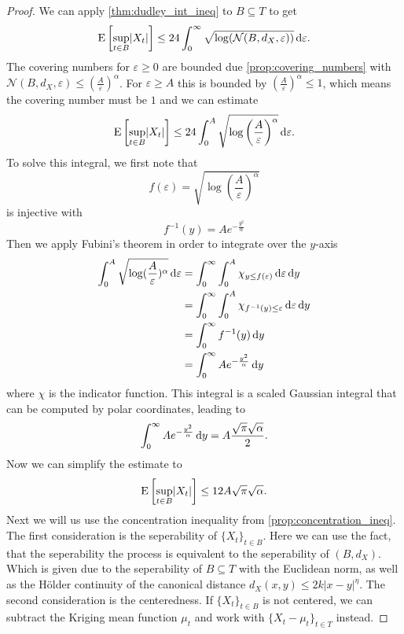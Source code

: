 \begin{proof}
We can apply \cref{thm:dudley_int_ineq} to $B \subseteq T$ to get
\[
    \E \left[ \sup_{t \in B} \lvert X_{t} \rvert \right]
    \leq
    24\int_{0}^{\infty} \sqrt{\log (\mathcal{N}(B,d_{X},\varepsilon) )}\dx[\varepsilon].
\]
The covering numbers for \( \varepsilon \geq 0 \) are bounded due \cref{prop:covering_numbers} with $\mathcal{N}(B,d_{X},\varepsilon) \leq \left( \frac{A}{\varepsilon}  \right)^{\alpha} $.
For \( \varepsilon \geq A \) this is bounded by $ \left( \frac{A}{\varepsilon}  \right)^{\alpha} \leq 1$, which means the covering number must be $1$ and we can estimate
\[
    \E \left[ \sup_{t \in B} \lvert X_{t} \rvert \right]
    \leq
    24\int_{0}^{A} \sqrt{\log \left(\frac{A}{\varepsilon}\right)^{\alpha}}\dx[\varepsilon].
\]
%
To solve this integral, we first note that
\[
    f(\varepsilon) = \sqrt{\log (\frac{A}{\varepsilon})^{\alpha}}
\]
is injective with 
\[ f^{-1}(y) = A e^{-\frac{y^2}{\alpha}} \]
Then we apply Fubini's theorem in order to integrate over the $y$-axis
\begin{align*}
    \int_{0}^{A} \sqrt{\log (\frac{A}{\varepsilon})^{\alpha}}\dx[\varepsilon] &= \int_{0}^{\infty} \int_{0}^{A} \chi_{y \leq f(\varepsilon)} \dx[\varepsilon]\dx[y]\\
    &= \int_{0}^{\infty} \int_{0}^{A} \chi_{f^{-1}(y) \leq \varepsilon} \dx[\varepsilon]\dx[y] \\
    &= \int_{0}^{\infty} f^{-1}(y) \dx[y]\\
    &= \int_{0}^{\infty} A e^{-\frac{y^2}{\alpha}} \dx[y]
\end{align*}
where $\chi$ is the indicator function.
This integral is a scaled Gaussian integral that can be computed by polar coordinates, leading to
\[
    \int_{0}^{\infty} A e^{-\frac{y^2}{\alpha}} \dx[y] = A \frac{\sqrt{\pi} \sqrt{\alpha}}{2}.
\]
Now we can simplify the estimate to
\[
    \E \left[ \sup_{t \in B} \lvert X_{t} \rvert \right]
    \leq 12 A \sqrt{\pi} \sqrt{\alpha}.
\]
%
%
Next we will us use the concentration inequality from \cref{prop:concentration_ineq}.
The first consideration is the seperability of $\{ X_{t} \}_{t \in B}$. Here we can use the fact, that the seperability the process is equivalent to the seperability of $(B,d_{X})$. Which is given due to the seperability of $B \subseteq T$ with the Euclidean norm, as well as the Hölder continuity of the canonical distance
\(
    d_{X}(x,y) \leq  2k  \lvert x-y \rvert^{\eta}.
\)
The second consideration is the centeredness. If $\{ X_{t} \}_{t \in B}$ is not centered, we can subtract the Kriging mean function $\mu_{t}$ and work with $\{ X_{t}-\mu_{t} \}_{t \in T}$ instead.

\end{proof}
